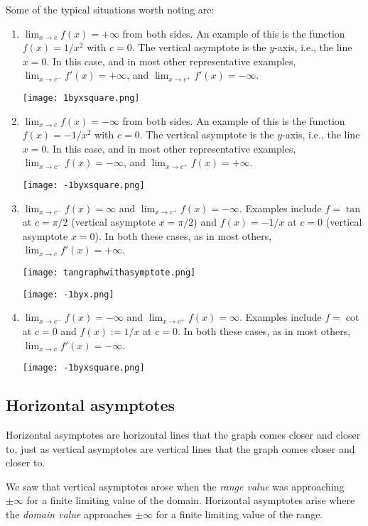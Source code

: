 \documentclass[10pt]{amsart}
\begin{document}
Some of the typical situations worth noting are:

\begin{enumerate}
\item $\lim_{x \to c} f(x) = +\infty$ from both sides. An example of
  this is the function $f(x) = 1/x^2$ with $c = 0$. The vertical
  asymptote is the $y$-axis, i.e., the line $x = 0$. In this case, and
  in most other representative examples, $\lim_{x \to c^-} f'(x) =
  +\infty$, and $\lim_{x \to c^+} f'(x) = -\infty$.
  
  \texttt{[image: 1byxsquare.png]}

\item $\lim_{x \to c} f(x) = -\infty$ from both sides. An example of
  this is the function $f(x) = -1/x^2$ with $c = 0$. The vertical
  asymptote is the $y$-axis, i.e., the line $x = 0$. In this case, and
  in most other representative examples, $\lim_{x \to c^-} f(x) =
  -\infty$, and $\lim_{x \to c^+} f(x) = +\infty$.

  \texttt{[image: -1byxsquare.png]}

\item $\lim_{x \to c^-} f(x) = \infty$ and $\lim_{x \to c^+} f(x) =
  -\infty$. Examples include $f = \tan$ at $c = \pi/2$ (vertical
  asymptote $x = \pi/2$) and $f(x) = -1/x$ at $c = 0$ (vertical
  asymptote $x = 0$). In both these cases, as in most others, $\lim_{x
    \to c} f'(x) = +\infty$.

  \texttt{[image: tangraphwithasymptote.png]}

  \texttt{[image: -1byx.png]}
\item $\lim_{x \to c^-} f(x) = -\infty$ and $\lim_{x \to c^+} f(x) =
  \infty$. Examples include $f = \cot$ at $c = 0$ and $f(x) := 1/x$ at
  $c = 0$. In both these cases, as in most others, $\lim_{x \to c}
  f'(x) = -\infty$.

  \texttt{[image: -1byxsquare.png]}

\end{enumerate}

\subsection{Horizontal asymptotes}

Horizontal asymptotes are horizontal lines that the graph comes closer
and closer to, just as vertical asymptotes are vertical lines that the
graph comes closer and closer to.

We saw that vertical asymptotes arose when the {\em range value} was
approaching $\pm \infty$ for a finite limiting value of the
domain. Horizontal asymptotes arise where the {\em domain value}
approaches $\pm \infty$ for a finite limiting value of the range.
\end{document}

